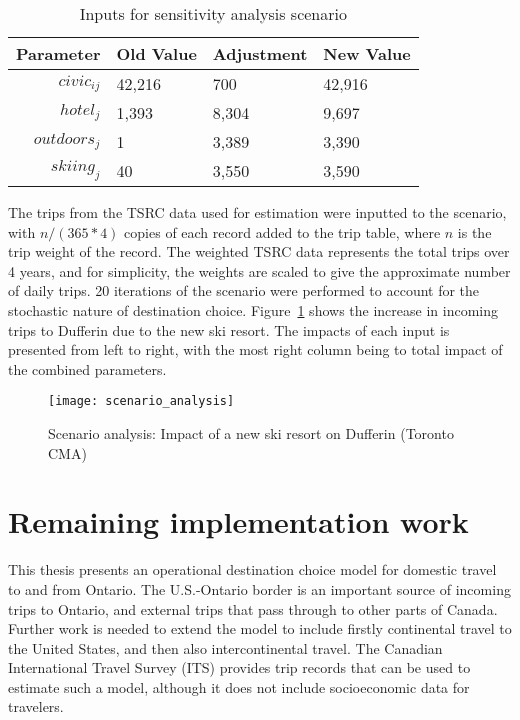 \begin{table}[H]
\centering
\caption{Inputs for sensitivity analysis scenario}
\label{table:scenario-inputs}
\begin{tabular}{@{}rlll@{}}
  \toprule
 Parameter & Old Value & Adjustment & New Value  \\ \midrule
  $civic_{ij}$ & 42,216 & 700 & 42,916  \\ 
  $hotel_j$ & 1,393  & 8,304 & 9,697  \\ 
  $outdoors_j$  & 1 & 3,389 & 3,390  \\ 
  $skiing_j$ & 40  & 3,550 & 3,590 \\ 
   \bottomrule
\end{tabular}
\end{table}

The trips from the TSRC data used for estimation were inputted to the scenario, with $n/(365*4)$ copies of each record added to the trip table, where $n$ is the trip weight of the record. The weighted TSRC data represents the total trips over 4 years, and for simplicity, the weights are scaled to give the approximate number of daily trips. 20 iterations of the scenario were performed to account for the stochastic nature of destination choice. Figure~\ref{fig:scenario-results} shows the increase in incoming trips to Dufferin due to the new ski resort. The impacts of each input is presented from left to right, with the most right column being to total impact of the combined parameters. 

\begin{figure}[H]
\centering
\texttt{[image: scenario\_analysis]}
\caption{Scenario analysis: Impact of a new ski resort on Dufferin (Toronto CMA)}
\label{fig:scenario-results}
\end{figure}


\section{Remaining implementation work}
This thesis presents an operational destination choice model for domestic travel to and from Ontario. The U.S.-Ontario border is an important source of incoming trips to Ontario, and external trips that pass through to other parts of Canada. Further work is needed to extend the model to include firstly continental travel to the United States, and then also intercontinental travel. The Canadian International Travel Survey (ITS) provides trip records that can be used to estimate such a model, although it does not include socioeconomic data for travelers. 

